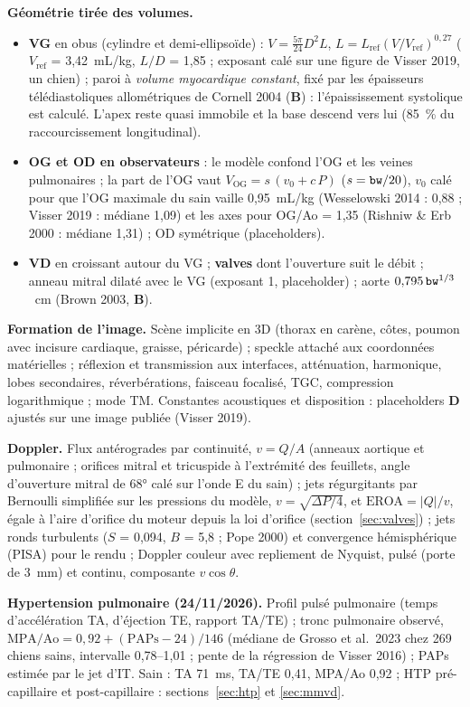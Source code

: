 \documentclass[10pt,a4paper]{article}
\newcommand{\vp}[1]{\text{\texttt{\detokenize{#1}}}}
\newcommand{\evB}{\textcolor{green!45!black}{\textbf{B}}}
\newcommand{\evD}{\textcolor{red!70!black}{\textbf{D}}}
\begin{document}
\textbf{Géométrie tirée des volumes.}
\begin{itemize}
\item \textbf{VG} en obus (cylindre et demi-ellipsoïde) : $V = \tfrac{5\pi}{24}D^2L$, $L = L_\text{ref}(V/V_\text{ref})^{0{,}27}$ ($V_\text{ref}$ = 3,42~mL/kg, $L/D$ = 1,85 ; exposant calé sur une figure de Visser 2019, un chien) ; paroi à \emph{volume myocardique constant}, fixé par les épaisseurs télédiastoliques allométriques de Cornell 2004 (\evB{}) : l'épaississement systolique est calculé. L'apex reste quasi immobile et la base descend vers lui (85~\% du raccourcissement longitudinal).
\item \textbf{OG et OD en observateurs} : le modèle confond l'OG et les veines pulmonaires ; la part de l'OG vaut $V_\text{OG} = s\,(v_0 + c\,P)$ ($s = \vp{bw}/20$), $v_0$ calé pour que l'OG maximale du sain vaille 0,95~mL/kg (Wesselowski 2014 : 0,88 ; Visser 2019 : médiane 1,09) et les axes pour OG/Ao = 1,35 (Rishniw \& Erb 2000 : médiane 1,31) ; OD symétrique (placeholders).
\item \textbf{VD} en croissant autour du VG ; \textbf{valves} dont l'ouverture suit le débit ; anneau mitral dilaté avec le VG (exposant 1, placeholder) ; aorte $0{,}795\,\vp{bw}^{1/3}$~cm (Brown 2003, \evB{}).
\end{itemize}

\textbf{Formation de l'image.} Scène implicite en 3D (thorax en carène, côtes, poumon avec incisure cardiaque, graisse, péricarde) ; speckle attaché aux coordonnées matérielles ; réflexion et transmission aux interfaces, atténuation, harmonique, lobes secondaires, réverbérations, faisceau focalisé, TGC, compression logarithmique ; mode TM. Constantes acoustiques et disposition : placeholders \evD{} ajustés sur une image publiée (Visser 2019).

\textbf{Doppler.} Flux antérogrades par continuité, $v = Q/A$ (anneaux aortique et pulmonaire ; orifices mitral et tricuspide à l'extrémité des feuillets, angle d'ouverture mitral de 68° calé sur l'onde E du sain) ; jets régurgitants par Bernoulli simplifiée sur les pressions du modèle, $v = \sqrt{\Delta P/4}$, et $\text{EROA} = |Q|/v$, égale à l'aire d'orifice du moteur depuis la loi d'orifice (section~\ref{sec:valves}) ; jets ronds turbulents ($S$ = 0,094, $B$ = 5,8 ; Pope 2000) et convergence hémisphérique (PISA) pour le rendu ; Doppler couleur avec repliement de Nyquist, pulsé (porte de 3~mm) et continu, composante $v\cos\theta$.

\textbf{Hypertension pulmonaire (24/11/2026).} Profil pulsé pulmonaire (temps d'accélération TA, d'éjection TE, rapport TA/TE) ; tronc pulmonaire observé, $\text{MPA/Ao} = 0{,}92 + (\text{PAPs} - 24)/146$ (médiane de Grosso et al.\ 2023 chez 269 chiens sains, intervalle 0,78--1,01 ; pente de la régression de Visser 2016) ; PAPs estimée par le jet d'IT. Sain : TA 71~ms, TA/TE 0,41, MPA/Ao 0,92 ; HTP pré-capillaire et post-capillaire : sections~\ref{sec:htp} et \ref{sec:mmvd}.
\end{document}

